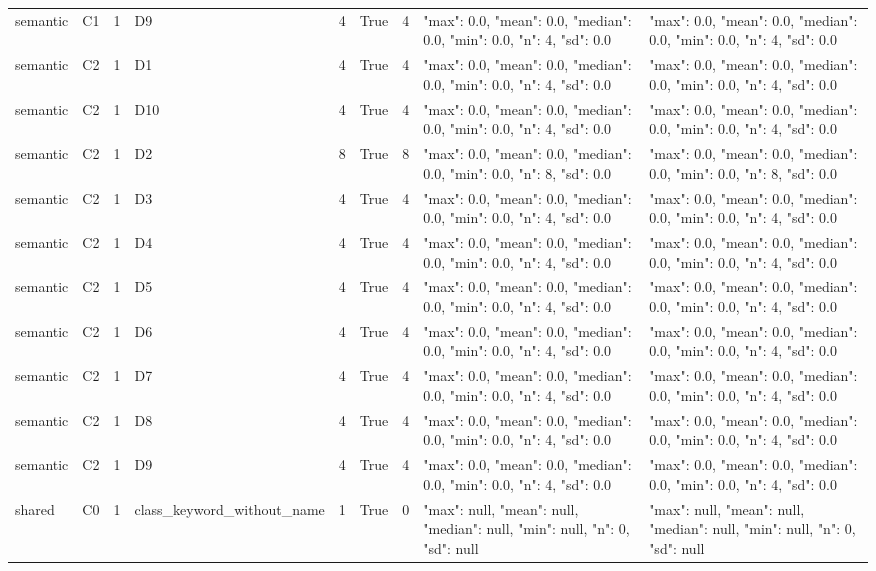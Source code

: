\begin{tabular}{lllllllll}
semantic & C1 & 1 & D9 & 4 & True & 4 & {"max": 0.0, "mean": 0.0, "median": 0.0, "min": 0.0, "n": 4, "sd": 0.0} & {"max": 0.0, "mean": 0.0, "median": 0.0, "min": 0.0, "n": 4, "sd": 0.0} \\
semantic & C2 & 1 & D1 & 4 & True & 4 & {"max": 0.0, "mean": 0.0, "median": 0.0, "min": 0.0, "n": 4, "sd": 0.0} & {"max": 0.0, "mean": 0.0, "median": 0.0, "min": 0.0, "n": 4, "sd": 0.0} \\
semantic & C2 & 1 & D10 & 4 & True & 4 & {"max": 0.0, "mean": 0.0, "median": 0.0, "min": 0.0, "n": 4, "sd": 0.0} & {"max": 0.0, "mean": 0.0, "median": 0.0, "min": 0.0, "n": 4, "sd": 0.0} \\
semantic & C2 & 1 & D2 & 8 & True & 8 & {"max": 0.0, "mean": 0.0, "median": 0.0, "min": 0.0, "n": 8, "sd": 0.0} & {"max": 0.0, "mean": 0.0, "median": 0.0, "min": 0.0, "n": 8, "sd": 0.0} \\
semantic & C2 & 1 & D3 & 4 & True & 4 & {"max": 0.0, "mean": 0.0, "median": 0.0, "min": 0.0, "n": 4, "sd": 0.0} & {"max": 0.0, "mean": 0.0, "median": 0.0, "min": 0.0, "n": 4, "sd": 0.0} \\
semantic & C2 & 1 & D4 & 4 & True & 4 & {"max": 0.0, "mean": 0.0, "median": 0.0, "min": 0.0, "n": 4, "sd": 0.0} & {"max": 0.0, "mean": 0.0, "median": 0.0, "min": 0.0, "n": 4, "sd": 0.0} \\
semantic & C2 & 1 & D5 & 4 & True & 4 & {"max": 0.0, "mean": 0.0, "median": 0.0, "min": 0.0, "n": 4, "sd": 0.0} & {"max": 0.0, "mean": 0.0, "median": 0.0, "min": 0.0, "n": 4, "sd": 0.0} \\
semantic & C2 & 1 & D6 & 4 & True & 4 & {"max": 0.0, "mean": 0.0, "median": 0.0, "min": 0.0, "n": 4, "sd": 0.0} & {"max": 0.0, "mean": 0.0, "median": 0.0, "min": 0.0, "n": 4, "sd": 0.0} \\
semantic & C2 & 1 & D7 & 4 & True & 4 & {"max": 0.0, "mean": 0.0, "median": 0.0, "min": 0.0, "n": 4, "sd": 0.0} & {"max": 0.0, "mean": 0.0, "median": 0.0, "min": 0.0, "n": 4, "sd": 0.0} \\
semantic & C2 & 1 & D8 & 4 & True & 4 & {"max": 0.0, "mean": 0.0, "median": 0.0, "min": 0.0, "n": 4, "sd": 0.0} & {"max": 0.0, "mean": 0.0, "median": 0.0, "min": 0.0, "n": 4, "sd": 0.0} \\
semantic & C2 & 1 & D9 & 4 & True & 4 & {"max": 0.0, "mean": 0.0, "median": 0.0, "min": 0.0, "n": 4, "sd": 0.0} & {"max": 0.0, "mean": 0.0, "median": 0.0, "min": 0.0, "n": 4, "sd": 0.0} \\
shared & C0 & 1 & class\_keyword\_without\_name & 1 & True & 0 & {"max": null, "mean": null, "median": null, "min": null, "n": 0, "sd": null} & {"max": null, "mean": null, "median": null, "min": null, "n": 0, "sd": null} \\

\end{tabular}
